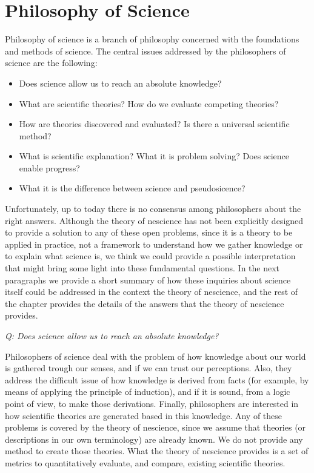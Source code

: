 %
%

\section{Philosophy of Science}

Philosophy of science is a branch of philosophy concerned with the foundations and methods of science. The central issues addressed by the philosophers of science are the following:

\vskip 0.25cm

\begin{itemize}
\item Does science allow us to reach an absolute knowledge?
\item What are scientific theories? How do we evaluate competing theories?
\item How are theories discovered and evaluated? Is there a universal scientific method?
\item What is scientific explanation? What it is problem solving? Does science enable progress?
\item What it is the difference between science and pseudosicence?
\end{itemize}

\vskip 0.25cm

Unfortunately, up to today there is no consensus among philosophers about the right answers. Although the theory of nescience has not been explicitly designed to provide a solution to any of these open problems, since it is a theory to be applied in practice, not a framework to understand how we gather knowledge or to explain what science is, we think we could provide a possible interpretation that might bring some light into these fundamental questions. In the next paragraphs we provide a short summary of how these inquiries about science itself could be addressed in the context the theory of nescience, and the rest of the chapter provides the details of the answers that the theory of nescience provides.

\vskip 0.5cm


\emph{Q: Does science allow us to reach an absolute knowledge?}

Philosophers of science deal with the problem of how knowledge about our world is gathered trough our senses, and if we can trust our perceptions. Also, they address the difficult issue of how knowledge is derived from facts (for example, by means of applying the principle of induction), and if it is sound, from a logic point of view, to make those derivations. Finally, philosophers are interested in how scientific theories are generated based in this knowledge. Any of these problems is covered by the theory of nescience, since we assume that theories (or descriptions in our own terminology) are already known. We do not provide any method to create those theories. What the theory of nescience provides is a set of metrics to quantitatively evaluate, and compare, existing scientific theories. 


